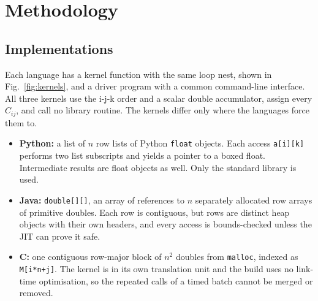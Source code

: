 \documentclass[11pt,a4paper]{article}
\begin{document}
\section{Methodology}
\label{sec:method}

\subsection{Implementations}

Each language has a kernel function with the same loop nest, shown in
Fig.~\ref{fig:kernels}, and a driver program with a common command-line
interface. All three kernels use the i-j-k order and a scalar double
accumulator, assign every $C_{ij}$, and call no library routine. The kernels
differ only where the languages force them to.
\begin{itemize}
  \item \textbf{Python:} a list of $n$ row lists of Python \texttt{float} objects.
  Each access \texttt{a[i][k]} performs two list subscripts and yields a pointer
  to a boxed float. Intermediate results are float objects as well. Only the
  standard library is used.
  \item \textbf{Java:} \texttt{double[][]}, an array of references to $n$
  separately allocated row arrays of primitive doubles. Each row is contiguous,
  but rows are distinct heap objects with their own headers, and every access is
  bounds-checked unless the JIT can prove it safe.
  \item \textbf{C:} one contiguous row-major block of $n^2$ doubles from
  \texttt{malloc}, indexed as \texttt{M[i*n+j]}. The kernel is in its own
  translation unit and the build uses no link-time optimisation, so the
  repeated calls of a timed batch cannot be merged or removed.
\end{itemize}
\end{document}
